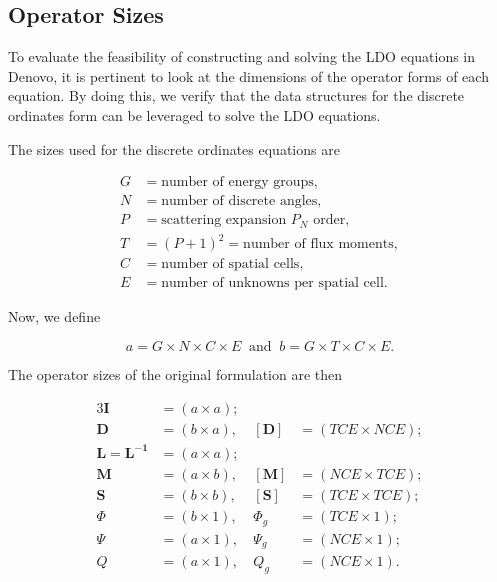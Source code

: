 \documentclass{article} %
\newcommand{\ve}[1]{\ensuremath{\mathbf{#1}}}
\begin{document}
\subsection{Operator Sizes}

To evaluate the feasibility of constructing and solving the LDO equations in
Denovo, it is pertinent to look at the dimensions of the operator forms of each
equation. By doing this, we verify that the data structures for the discrete
ordinates form can be leveraged to solve the LDO equations.

The sizes used for the discrete ordinates equations are

\begin{equation*}
  \begin{aligned}
    G &= \text{number of energy groups},\\
    N &= \text{number of discrete angles},\\
    P &= \text{scattering expansion $P_N$ order},\\
    T &= (P+1)^2 = \text{number of flux moments},\\
    C &= \text{number of spatial cells},\\
    E &= \text{number of unknowns per spatial cell}.
  \end{aligned}
\end{equation*}

\noindent Now, we define

\begin{equation}
  a = G \times N \times C \times E\ \text{ and }\
  b = G \times T \times C \times E.
\label{eq:dims}
\end{equation}

\noindent The operator sizes of the original formulation are then

\begin{alignat*}{3}
\ve{I} &= (a \times a);  \\
\ve{D} &= (b \times a),\ &[\ve{D}] &= (TCE \times NCE); \\
\ve{L} = \ve{L^{-1}} &= (a \times a);  \\
\ve{M} &= (a \times b),\ &[\ve{M}] &= (NCE \times TCE); \\
\ve{S} &= (b \times b),\ &[\ve{S}] &= (TCE \times TCE); \\
\Phi &= (b \times 1),\   &\Phi_g   &= (TCE \times 1); \\
\Psi &= (a \times 1),\   &\Psi_g   &= (NCE \times 1); \\
Q &= (a \times 1),\      &Q_g      &= (NCE \times 1).
\end{alignat*}
\end{document}
